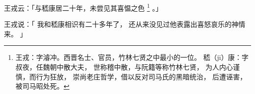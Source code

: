 
\switchcolumn*[\section{}]

王戎云：「与嵇康居二十年，未尝见其喜愠之色%
\footnote{%
    王戎：字濬冲。西晋名士、官员，竹林七贤之中最小的一位。
    嵇（jī）康：字叔夜，任魏朝中散大夫，
                世称稽中散，与阮籍等称竹林七贤，
                为人内心谨慎，而行为狂放，
                崇尚老庄哲学，借以反对司马氏的黑暗统治，
                后遭诬害，被司马昭处死。
}%
。」

\switchcolumn

王戎说：「
    我和嵇康相识有二十多年了，
    还从来没见过他表露出喜怒哀乐的神情来。
」
